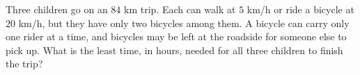 Three children go on an $84$ km trip. Each can walk at $5$ km/h or ride a bicycle at $20$ km/h, but they have only two bicycles among them. A bicycle can carry only one rider at a time, and bicycles may be left at the roadside for someone else to pick up. What is the least time, in hours, needed for all three children to finish the trip?
